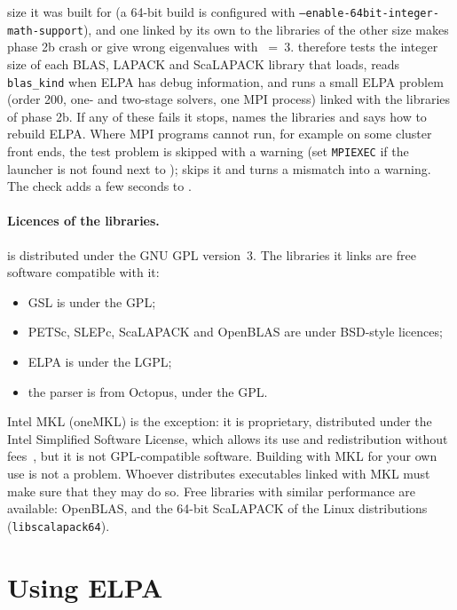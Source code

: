 \begin{itemize}
  size it was built for (a 64-bit build is configured with
  \texttt{--enable-64bit-integer-math-support}), and one linked by its own
   to the libraries of the other size makes phase 2b crash
  or give wrong eigenvalues with ~=~3. 
  therefore tests the integer size of each BLAS, LAPACK and ScaLAPACK
  library that  loads, reads \texttt{blas\_kind} when
  ELPA has debug information, and runs a small ELPA problem (order 200,
  one- and two-stage solvers, one MPI process) linked with the libraries
  of phase 2b. If any of these fails it stops, names the libraries and
  says how to rebuild ELPA. Where MPI programs cannot run, for example on
  some cluster front ends, the test problem is skipped with a warning (set
  \texttt{MPIEXEC} if the launcher is not found next to );
   skips it and turns a mismatch into a
  warning. The check adds a few seconds to .
\end{itemize}

\paragraph{Licences of the libraries.} \ac{} is distributed under the GNU
GPL version~3. The libraries it links are free software compatible with it:
\begin{itemize}
\item GSL is under the GPL;
\item PETSc, SLEPc, ScaLAPACK and OpenBLAS are under BSD-style licences;
\item ELPA is under the LGPL;
\item the parser is from Octopus, under the GPL.
\end{itemize}
Intel MKL (oneMKL) is the exception: it is proprietary, distributed under
the Intel Simplified Software License, which allows its use and
redistribution without fees~\cite{intel-mkl-faq}, but it is not
GPL-compatible software. Building \ac{} with MKL for your own use is not a
problem. Whoever distributes executables linked with MKL must make sure
that they may do so. Free libraries with similar performance are
available: OpenBLAS, and the 64-bit ScaLAPACK of the Linux distributions
(\texttt{libscalapack64}).

\section{Using ELPA}\label{sec:elpa}

